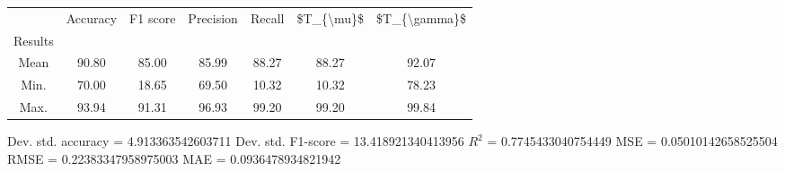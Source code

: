 \begin{tabular}{|c|c|c|c|c|c|c|}
\toprule
{} &  Accuracy &  F1 score &  Precision &  Recall &  \$T\_\{\textbackslash mu\}\$ &  \$T\_\{\textbackslash gamma\}\$ \\
Results &           &           &            &         &            &               \\
\hline
Mean    &     90.80 &     85.00 &      85.99 &   88.27 &      88.27 &         92.07 \\
Min.    &     70.00 &     18.65 &      69.50 &   10.32 &      10.32 &         78.23 \\
Max.    &     93.94 &     91.31 &      96.93 &   99.20 &      99.20 &         99.84 \\
\bottomrule
\end{tabular}

 Dev. std. accuracy = 4.913363542603711
 Dev. std. F1-score = 13.418921340413956
 $R^2$ = 0.7745433040754449
 MSE = 0.05010142658525504
 RMSE = 0.22383347958975003
 MAE = 0.0936478934821942